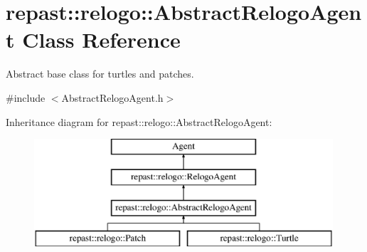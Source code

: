 \hypertarget{classrepast_1_1relogo_1_1_abstract_relogo_agent}{\section{repast\-:\-:relogo\-:\-:Abstract\-Relogo\-Agent Class Reference}
\label{classrepast_1_1relogo_1_1_abstract_relogo_agent}
}


Abstract base class for turtles and patches.  




{\ttfamily \#include $<$Abstract\-Relogo\-Agent.\-h$>$}

Inheritance diagram for repast\-:\-:relogo\-:\-:Abstract\-Relogo\-Agent\-:\begin{figure}[H]
\begin{center}
\leavevmode
\includegraphics[height=4.000000cm]{classrepast_1_1relogo_1_1_abstract_relogo_agent}
\end{center}
\end{figure}
